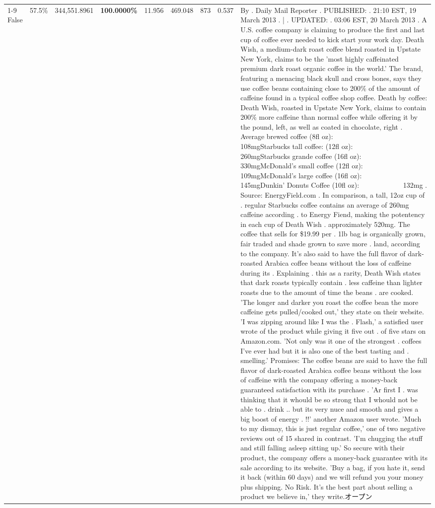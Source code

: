 \begin{table}[H]
{\begin{tabular}{lllrlllll}
\cline{1-9}
False & 57.5\% & 344,551.8961 & \bfseries \color{red} 100.0000\% & 11.956 & 469.048 & 873 & 0.537 & By . Daily Mail Reporter . PUBLISHED: . 21:10 EST, 19 March 2013 . | . UPDATED: . 03:06 EST, 20 March 2013 . A U.S. coffee company is claiming to produce the first and last cup of coffee ever needed to kick start your work day. Death Wish, a medium-dark roast coffee blend roasted in Upstate New York, claims to be the 'most highly caffeinated premium dark roast organic coffee in the world.' The brand, featuring a menacing black skull and cross bones, says they use coffee beans containing close to 200\% of the amount of caffeine found in a typical coffee shop coffee. Death by coffee: Death Wish, roasted in Upstate New York, claims to contain 200\% more caffeine than normal coffee while offering it by the pound, left, as well as coated in chocolate, right . Average brewed coffee (8fl oz):              108mgStarbucks tall coffee: (12fl oz):                260mgStarbucks grande coffee (16fl oz):         330mgMcDonald's small coffee (12fl oz):           109mgMcDonald's large coffee (16fl oz):           145mgDunkin' Donuts Coffee (10fl oz):             132mg . Source: EnergyField.com . In comparison, a tall, 12oz cup of . regular Starbucks coffee contains an average of 260mg caffeine according . to Energy Fiend, making the potentency in each cup of Death Wish . approximately 520mg. The coffee that sells for \$19.99 per . 1lb bag is organically grown, fair traded and shade grown to save more . land, according to the company. It's also said to have the full flavor of dark-roasted Arabica coffee beans without the loss of caffeine during its . Explaining . this as a rarity, Death Wish states that dark roasts typically contain . less caffeine than lighter roasts due to the amount of time the beans . are cooked. 'The longer and darker you roast the coffee bean the more caffeine gets pulled/cooked out,' they state on their website. 'I was zipping around like I was the . Flash,' a satisfied user wrote of the product while giving it five out . of five stars on Amazon.com. 'Not only was it one of the strongest . coffees I've ever had but it is also one of the best tasting and . smelling.’ Promises: The coffee beans are said to have the full flavor of dark-roasted Arabica coffee beans without the loss of caffeine with the company offering a money-back guaranteed satisfaction with its purchase . 'Ar first I . was thinking that it whould be so strong that I whould not be able to . drink .. but its very nuce and smooth and gives a big boost of energy . !!' another Amazon user wrote. 'Much to my dismay, this is just regular coffee,' one of two negative reviews out of 15 shared in contrast. 'I'm chugging the stuff and still falling asleep sitting up.' So secure with their product, the company offers a money-back guarantee with its sale according to its website. 'Buy a bag, if you hate it, send it back (within 60 days) and we will refund you your money plus shipping. No Risk. It’s the best part about selling a product we believe in,' they write.オープン \\

\end{tabular}}
\end{table}
